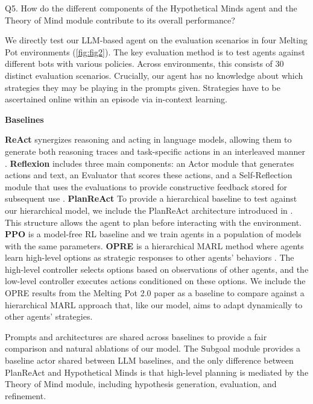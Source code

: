 \documentclass{article} %
\begin{document}
Q5. How do the different components of the Hypothetical Minds agent and the Theory of Mind module contribute to its overall performance?

We directly test our LLM-based agent on the evaluation scenarios in four Melting Pot environments (\autoref{fig:fig2}). The key evaluation method is to test agents against different bots with various policies. Across environments, this consists of 30 distinct evaluation scenarios. Crucially, our agent has no knowledge about which strategies they may be playing in the prompts given. Strategies have to be ascertained online within an episode via in-context learning.  

\textbf{Baselines}

\textbf{ReAct} synergizes reasoning and acting in language models, allowing them to generate both reasoning traces and task-specific actions in an interleaved manner \citep{yao2022react}. \textbf{Reflexion} includes three main components: an Actor module that generates actions and text, an Evaluator that scores these actions, and a Self-Reflection module that uses the evaluations to provide constructive feedback stored for subsequent use \citep{shinn2024reflexion}. \textbf{PlanReAct} To provide a hierarchical baseline to test against our hierarchical model, we include the PlanReAct architecture introduced in \citep{liu2023bolaa}. This structure allows the agent to plan before interacting with the environment. \textbf{PPO} is a model-free RL baseline \citep{schulman2017proximal} and we train agents in a population of models with the same parameters. \textbf{OPRE} is a hierarchical MARL method where agents learn high-level options as strategic responses to other agents' behaviors \citep{vezhnevets2020options}. The high-level controller selects options based on observations of other agents, and the low-level controller executes actions conditioned on these options. We include the OPRE results from the Melting Pot 2.0 paper \citep{agapiou2022melting} as a baseline to compare against a hierarchical MARL approach that, like our model, aims to adapt dynamically to other agents' strategies.

Prompts and architectures are shared across baselines to provide a fair comparison and natural ablations of our model. The Subgoal module provides a baseline actor shared between LLM baselines, and the only difference between PlanReAct and Hypothetical Minds is that high-level planning is mediated by the Theory of Mind module, including hypothesis generation, evaluation, and refinement.
\end{document}
